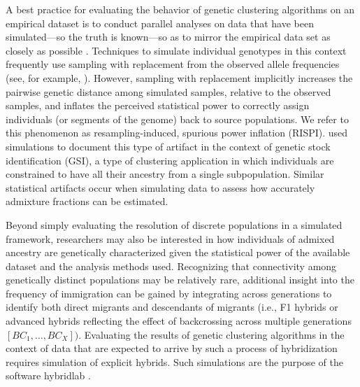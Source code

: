 A best practice for evaluating the behavior of genetic clustering algorithms on an empirical dataset is to conduct
parallel analyses on data that have been simulated---so the truth is known---so as to mirror the empirical data set
as closely as possible \citep{vaha2006efficiency,anderson2008improved,latch2011fine}.
Techniques to simulate individual genotypes in this context frequently use sampling with replacement from the
observed allele frequencies (see, for example, \citealt{nielsen2006hybridlab,kinziger2008hybridization}).
However, sampling with replacement implicitly increases the pairwise genetic distance among simulated samples, relative to the observed
samples, and
inflates the perceived statistical power to correctly assign individuals (or segments of the genome) back to source populations.
We refer to this phenomenon as resampling-induced, spurious power inflation (RISPI).
\citet{anderson2008improved} used simulations to document this type of artifact in the context of
genetic stock identification (GSI), a type of clustering application in which individuals are constrained to have
all their ancestry from a single subpopulation.
Similar statistical artifacts occur when simulating data to
assess how accurately admixture fractions can be estimated.


Beyond simply evaluating the resolution of discrete populations in a simulated framework, researchers may also be
interested in how individuals of admixed ancestry are genetically characterized given the statistical power of the available dataset and the
analysis methods used.
Recognizing that connectivity among genetically distinct populations may be relatively rare, additional insight into the
frequency of immigration can be gained by integrating across generations to identify both direct migrants and descendants of migrants
 (i.e., F1 hybrids or advanced hybrids reflecting the effect of backcrossing across multiple generations $[BC_1, \ldots,
BC_X])$.
Evaluating the results of genetic clustering algorithms in the context of data that are
expected to arrive by such a process of hybridization requires simulation of
explicit hybrids.  Such simulations are the purpose of the software {\sc hybridlab} 
\citep{nielsen2006hybridlab}.


